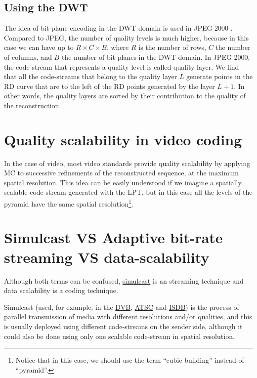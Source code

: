 \subsection{Using the DWT~\cite{vruiz__transform_coding}}

The idea of bit-plane encoding in the DWT domain is used in
JPEG 2000 \cite{vruiz__JPEG2000}. Compared to JPEG, the number of
quality levels is much higher, because in this case we can have up to
$R\times C\times B$, where $R$ is the number of rows, $C$ the number
of columns, and $B$ the number of bit planes in the DWT domain. In
JPEG 2000, the code-stream that represents a quality level is called
quality layer. We find that all the code-streams that belong to the
quality layer $L$ generate points in the RD curve that are to the
left of the RD points generated by the layer $L+1$. In other
words, the quality layers are sorted by their contribution to the
quality of the reconstruction.

\section{Quality scalability in video coding~\cite{vruiz__video_scalability}}

In the case of video, most video standards provide quality scalability
by applying MC to successive refinements of the reconstructed
sequence, at the maximum spatial resolution. This idea can be easily
understood if we imagine a spatially scalable code-stream generated
with the LPT, but in this case all the levels of the pyramid have the
same spatial resolution\footnote{Notice that in this case, we should
  use the term ``cubic building'' instead of ``pyramid''.}.


\section{Simulcast VS Adaptive bit-rate streaming VS data-scalability}


Although both terms can be confused,
\href{https://en.wikipedia.org/wiki/Simulcast}{simulcast} is an
streaming technique and data scalability is a coding technique.

Simulcast (used, for example, in the
\href{https://en.wikipedia.org/wiki/DVB}{DVB},
\href{https://en.wikipedia.org/wiki/ATSC_standards}{ATSC} and
\href{https://en.wikipedia.org/wiki/ISDB}{ISDB}) is the process of
parallel transmission of media with different resolutions and/or
qualities, and this is usually deployed using different code-streams
on the sender side, although it could also be done using only one
scalable code-stream in spatial resolution.

